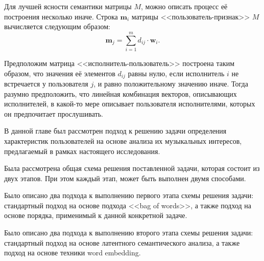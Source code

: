 Для лучшей ясности семантики матрицы $M$, можно описать
процесс её построения несколько иначе. Строка $\bm{m}_i$ матрицы 
<<пользователь-признак>> $M$ вычисляется следующим образом:
\[
    \bm{m}_j = \sum_{i=1}^{m} d_{ij} \cdot \bm{w}_i.
\]

Предположим матрица <<исполнитель-пользователь>> построена 
таким образом, что значения её элементов $d_{ij}$ равны нулю,
если исполнитель $i$ не встречается у пользователя $j$, и равно
положительному значению иначе. Тогда разумно предположить, что
линейная комбинация векторов, описывающих исполнителей, 
в какой-то мере описывает пользователя исполнителями, которых
он предпочитает прослушивать.

\chapterconclusion

В данной главе был рассмотрен подход к решению задачи
определения характеристик пользователей на основе анализа
их музыкальных интересов, предлагаемый в рамках настоящего
исследования. 

Была рассмотрена общая схема решения поставленной задачи,
которая состоит из двух этапов. При этом каждый этап, может
быть выполнен двумя способами.

Было описано два подхода к выполнению первого этапа схемы
решения задачи: стандартный подход на основе подхода
<<bag of words>>, а также подход на основе порядка, применимый
к данной конкретной задаче.

Было описано два подхода к выполнению второго этапа схемы
решения задачи: стандартный подход на основе латентного
семантического анализа, а также подход на основе техники
word embedding.
